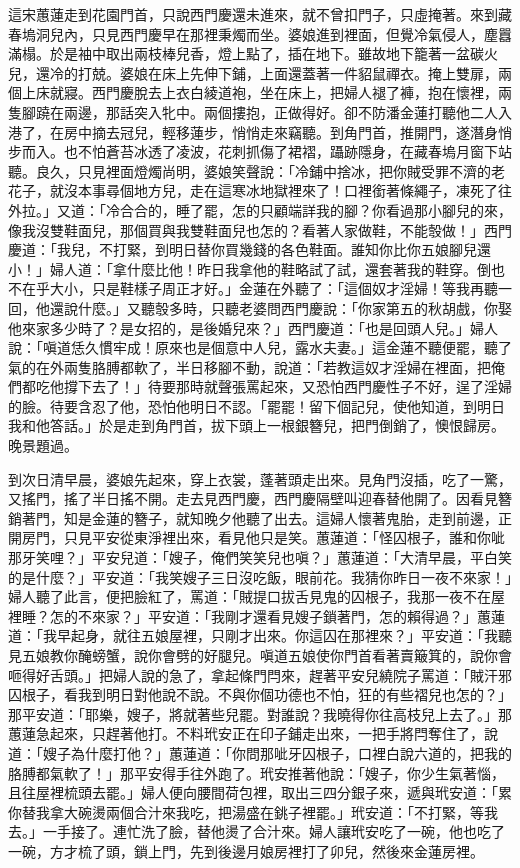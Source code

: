 這宋蕙蓮走到花園門首，只說西門慶還未進來，就不曾扣門子，只虛掩著。來到藏春塢洞兒內，只見西門慶早在那裡秉燭而坐。婆娘進到裡面，但覺冷氣侵人，塵囂滿榻。於是袖中取出兩枝棒兒香，燈上點了，插在地下。雖故地下籠著一盆碳火兒，還冷的打兢。婆娘在床上先伸下鋪，上面還蓋著一件貂鼠禪衣。掩上雙扉，兩個上床就寢。西門慶脫去上衣白綾道袍，坐在床上，把婦人褪了褲，抱在懷裡，兩隻腳蹺在兩邊，那話突入牝中。兩個摟抱，正做得好。卻不防潘金蓮打聽他二人入港了，在房中摘去冠兒，輕移蓮步，悄悄走來竊聽。到角門首，推開門，遂潛身悄步而入。也不怕蒼苔冰透了凌波，花刺抓傷了裙褶，躡跡隱身，在藏春塢月窗下站聽。良久，只見裡面燈燭尚明，婆娘笑聲說：「冷鋪中捨冰，把你賊受罪不濟的老花子，就沒本事尋個地方兒，走在這寒冰地獄裡來了！口裡銜著條繩子，凍死了往外拉。」又道：「冷合合的，睡了罷，怎的只顧端詳我的腳？你看過那小腳兒的來，像我沒雙鞋面兒，那個買與我雙鞋面兒也怎的？看著人家做鞋，不能彀做！」西門慶道：「我兒，不打緊，到明日替你買幾錢的各色鞋面。誰知你比你五娘腳兒還小！」婦人道：「拿什麼比他！昨日我拿他的鞋略試了試，還套著我的鞋穿。倒也不在乎大小，只是鞋樣子周正才好。」金蓮在外聽了：「這個奴才淫婦！等我再聽一回，他還說什麼。」又聽彀多時，只聽老婆問西門慶說：「你家第五的秋胡戲，你娶他來家多少時了？是女招的，是後婚兒來？」西門慶道：「也是回頭人兒。」婦人說：「嗔道恁久慣牢成！原來也是個意中人兒，露水夫妻。」這金蓮不聽便罷，聽了氣的在外兩隻胳膊都軟了，半日移腳不動，說道：「若教這奴才淫婦在裡面，把俺們都吃他撐下去了！」待要那時就聲張罵起來，又恐怕西門慶性子不好，逞了淫婦的臉。待要含忍了他，恐怕他明日不認。「罷罷！留下個記兒，使他知道，到明日我和他答話。」於是走到角門首，拔下頭上一根銀簪兒，把門倒銷了，懊恨歸房。晚景題過。

到次日清早晨，婆娘先起來，穿上衣裳，蓬著頭走出來。見角門沒插，吃了一驚，又搖門，搖了半日搖不開。走去見西門慶，西門慶隔壁叫迎春替他開了。因看見簪銷著門，知是金蓮的簪子，就知晚夕他聽了出去。這婦人懷著鬼胎，走到前邊，正開房門，只見平安從東淨裡出來，看見他只是笑。蕙蓮道：「怪囚根子，誰和你呲那牙笑哩？」平安兒道：「嫂子，俺們笑笑兒也嗔？」蕙蓮道：「大清早晨，平白笑的是什麼？」平安道：「我笑嫂子三日沒吃飯，眼前花。我猜你昨日一夜不來家！」婦人聽了此言，便把臉紅了，罵道：「賊提口拔舌見鬼的囚根子，我那一夜不在屋裡睡？怎的不來家？」平安道：「我剛才還看見嫂子鎖著門，怎的賴得過？」蕙蓮道：「我早起身，就往五娘屋裡，只剛才出來。你這囚在那裡來？」平安道：「我聽見五娘教你醃螃蟹，說你會劈的好腿兒。嗔道五娘使你門首看著賣簸箕的，說你會咂得好舌頭。」把婦人說的急了，拿起條門閂來，趕著平安兒繞院子罵道：「賊汗邪囚根子，看我到明日對他說不說。不與你個功德也不怕，狂的有些褶兒也怎的？」那平安道：「耶樂，嫂子，將就著些兒罷。對誰說？我曉得你往高枝兒上去了。」那蕙蓮急起來，只趕著他打。不料玳安正在印子鋪走出來，一把手將閂奪住了，說道：「嫂子為什麼打他？」蕙蓮道：「你問那呲牙囚根子，口裡白說六道的，把我的胳膊都氣軟了！」那平安得手往外跑了。玳安推著他說：「嫂子，你少生氣著惱，且往屋裡梳頭去罷。」婦人便向腰間荷包裡，取出三四分銀子來，遞與玳安道：「累你替我拿大碗燙兩個合汁來我吃，把湯盛在銚子裡罷。」玳安道：「不打緊，等我去。」一手接了。連忙洗了臉，替他燙了合汁來。婦人讓玳安吃了一碗，他也吃了一碗，方才梳了頭，鎖上門，先到後邊月娘房裡打了卯兒，然後來金蓮房裡。

